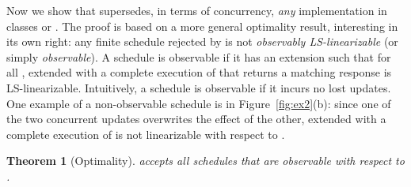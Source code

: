 \documentclass[11pt,pdftex,letterpaper]{article}
\newtheorem{theorem}{Theorem}
\begin{document}
Now we show that  supersedes, in terms of concurrency, \emph{any} implementation in classes
 or .
The proof is based on a more general optimality result, interesting in its own right: 
any finite schedule rejected by  is not \emph{observably
LS-linearizable} (or simply \emph{observable}). 
A schedule  is observable 
if it has an extension  such that for all , 
 extended with a complete execution of  that returns a matching response is LS-linearizable. 
Intuitively, a schedule is observable if it incurs no lost updates.
One example of a non-observable schedule is  in
Figure~\ref{fig:ex2}(b): since one of the two concurrent
updates overwrites the effect of the other,  extended with a
complete execution of  
is not linearizable with respect to .
\begin{theorem}[Optimality]
\label{th:lrelaxed}
 accepts all schedules that are observable with respect to .
\end{theorem}
\end{document}
